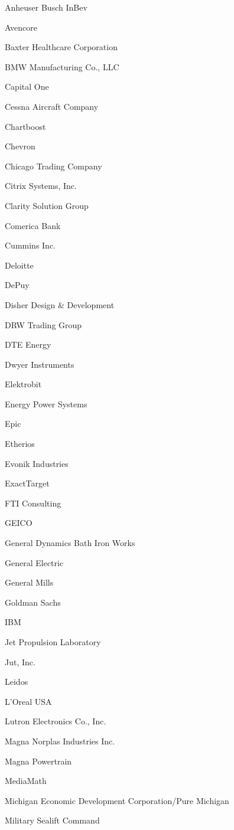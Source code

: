 \documentclass[twoside]{article}
\begin{document}
\begin{center}
\begin{multicols}{5}
\begin{FlushLeft}
\begin{compactitem}
\item Anheuser Busch InBev
\item Avencore
\item Baxter Healthcare Corporation
\item BMW Manufacturing Co., LLC
\item Capital One
\item Cessna Aircraft Company
\item Chartboost
\item Chevron
\item Chicago Trading Company
\item Citrix Systems, Inc.
\item Clarity Solution Group
\item Comerica Bank
\item Cummins Inc.
\item Deloitte
\item DePuy
\item Disher Design \& Development
\item DRW Trading Group
\item DTE Energy
\item Dwyer Instruments
\item Elektrobit
\item Energy Power Systems
\item Epic
\item Etherios
\item Evonik Industries
\item ExactTarget
\item FTI Consulting
\item GEICO
\item General Dynamics Bath Iron Works
\item General Electric
\item General Mills
\item Goldman Sachs
\item IBM
\item Jet Propulsion Laboratory
\item Jut, Inc.
\item Leidos
\item L'Oreal USA
\item Lutron Electronics Co., Inc.
\item Magna Norplas Industries Inc.
\item Magna Powertrain
\item MediaMath
\item Michigan Economic Development Corporation/Pure Michigan
\item Military Sealift Command

\end{compactitem}
\end{FlushLeft}
\end{multicols}
\end{center}
\end{document}
